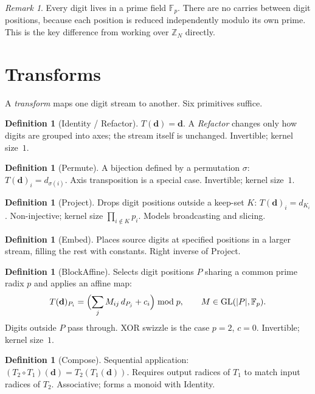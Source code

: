 \documentclass[11pt]{article}
\theoremstyle{definition}
\newtheorem{definition}[theorem]{Definition}
\theoremstyle{remark}
\newtheorem*{remark}{Remark}
\newcommand{\Z}{\mathbb{Z}}
\newcommand{\F}{\mathbb{F}}
\newcommand{\GL}{\mathrm{GL}}
\begin{document}
\begin{remark}
Every digit lives in a prime field $\F_p$.
There are no carries between digit positions, because each position is reduced independently modulo its own prime.
This is the key difference from working over $\Z_N$ directly.
\end{remark}

\section{Transforms}

A \emph{transform} maps one digit stream to another.
Six primitives suffice.

\begin{definition}[Identity / Refactor]
$T(\mathbf{d}) = \mathbf{d}$.
A \emph{Refactor} changes only how digits are grouped into axes; the stream itself is unchanged.
Invertible; kernel size~$1$.
\end{definition}

\begin{definition}[Permute]
A bijection defined by a permutation $\sigma$: $T(\mathbf{d})_i = d_{\sigma(i)}$.
Axis transposition is a special case.
Invertible; kernel size~$1$.
\end{definition}

\begin{definition}[Project]
Drops digit positions outside a keep-set $K$: $T(\mathbf{d})_i = d_{K_i}$.
Non-injective; kernel size $\prod_{i\notin K} p_i$.
Models broadcasting and slicing.
\end{definition}

\begin{definition}[Embed]
Places source digits at specified positions in a larger stream, filling the rest with constants.
Right inverse of Project.
\end{definition}

\begin{definition}[BlockAffine]
Selects digit positions $P$ sharing a common prime radix $p$ and applies an affine map:
\[
T(\mathbf{d})_{P_i} = \Bigl(\sum_j M_{ij}\,d_{P_j} + c_i\Bigr) \bmod p,
\qquad M \in \GL(|P|, \F_p).
\]
Digits outside $P$ pass through.
XOR swizzle is the case $p=2$, $c=0$.
Invertible; kernel size~$1$.
\end{definition}

\begin{definition}[Compose]
Sequential application: $(T_2 \circ T_1)(\mathbf{d}) = T_2(T_1(\mathbf{d}))$.
Requires output radices of $T_1$ to match input radices of $T_2$.
Associative; forms a monoid with Identity.
\end{definition}
\end{document}
